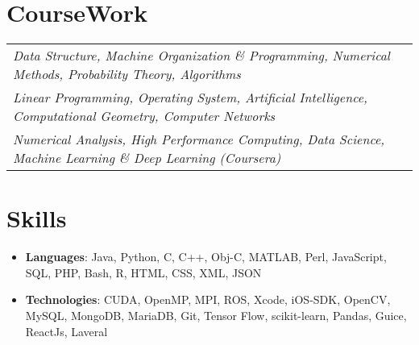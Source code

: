 \documentclass[a4paper,11pt]{article}
\makeatletter
\newcommand{\courseWork}[3]{
  \vspace{-1pt}
    \begin{tabular*}{0.97\textwidth}{l@{\extracolsep{\fill}}r}
      \textit{\small #1}\\
    	  \textit{\small #2}\\
       \textit{\small #3}\\
    \end{tabular*}\vspace{-5pt}
}
\newcommand{\skillItem}[2]{
	\item\small{
    \textbf{#1}{: #2 \vspace{-5pt}}
  }
}
\newcommand{\sectionStart}{\begin{itemize}[leftmargin=*]}
\newcommand{\sectionEnd}{\end{itemize}}
\makeatother
\begin{document}
\section{CourseWork}
	\courseWork{Data Structure, Machine Organization \& Programming, Numerical Methods, Probability Theory, Algorithms}{Linear Programming, Operating System, Artificial Intelligence, Computational Geometry, Computer Networks}{Numerical Analysis, High Performance Computing, Data Science, Machine Learning \& Deep Learning (Coursera)}

\section{Skills}
	\sectionStart
		\skillItem{Languages}
		{Java, Python, C, C++, Obj-C, MATLAB, Perl, JavaScript, SQL, PHP, Bash, R, HTML, CSS, XML, JSON}
		\skillItem{Technologies}
		{CUDA, OpenMP, MPI, ROS, Xcode, iOS-SDK, OpenCV, MySQL, MongoDB, MariaDB, Git, Tensor Flow, scikit-learn, Pandas, Guice, ReactJs, Laveral}
	\sectionEnd
\end{document}
